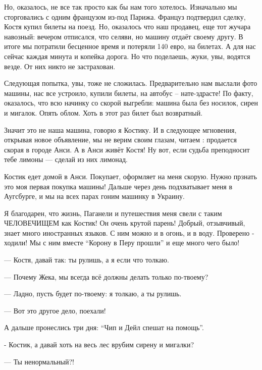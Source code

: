 
Но, оказалось, не все так просто как бы нам того хотелось. Изначально мы
сторговались с одним французом из-под Парижа.  Француз подтвердил сделку,
Костя купил билеты на поезд. Но, оказалось что наш продавец, еще тот жучара
навозный:  вечером отписался, что селяви, но машину отдаёт своему другу.  В
итоге мы потратили бесценное время и потеряли 140 евро, на билетах. А для нас
сейчас  каждая минута и копейка дорога. Но что поделаешь, жуки, увы, водятся
везде. От них никто не застрахован. 


Следующая попытка, увы, тоже не сложилась. Предварительно нам выслали фото
машины, нас все устроило,  купили билеты, на автобус – нате-здрасте! По факту,
оказалось, что всю начинку со скорой выгребли: машина была без носилок, сирен и
мигалок. Опять облом. Хоть в этот раз билет был возвратный. 

Значит это не наша машина, говорю я Костику. И в следующее мгновения, открывая
новое объявление, мы не верим своим глазам, читаем : продается скорая в городе
Анси.  А в Анси живёт Костя! Ну вот, если судьба преподносит тебе лимоны —
сделай из них лимонад.

Костик едет домой в Анси. Покупает, оформляет на меня скорую. Нужно прзнать это
моя первая покупка машины! Дальше через день подхватывает меня в Аугсбурге, и
мы на всех парах гоним машинку в Украину.

Я благодарен, что жизнь, Паганели и путешествия меня свели с таким ЧЕЛОВЕЧИЩЕМ
как Костик! Он очень крутой парень! Добрый, отзывчивый, знает много иностранных
языков. С ним можно и в огонь, и в воду. Проверено - ходили! Мы с ним вместе
\enquote{Корону в Перу прошли} и еще много чего было!

— Костя, давай так: ты рулишь, а я если что толкаю.

— Почему Жека, мы всегда всё должны делать только по-твоему?

— Ладно, пусть будет по-твоему: я толкаю, а ты рулишь.

— Вот это другое дело, поехали!

А дальше пронеслись три дня: \enquote{Чип и Дейл спешат на помощь}.  

- Костик, а давай хоть на весь лес врубим сирену и мигалки?

— Ты ненормальный?! 

